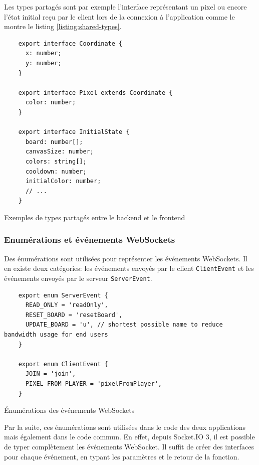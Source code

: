 Les types partagés sont par exemple l'interface représentant un pixel ou encore l'état initial reçu par le client lors de la connexion à l'application comme le montre le listing \ref{listing:shared-types}.

\begin{listing}[H]
  \begin{verbatim}
    export interface Coordinate {
      x: number;
      y: number;
    }

    export interface Pixel extends Coordinate {
      color: number;
    }

    export interface InitialState {
      board: number[];
      canvasSize: number;
      colors: string[];
      cooldown: number;
      initialColor: number;
      // ...
    }
\end{verbatim}
  \caption{Exemples de types partagés entre le backend et le frontend}
  \label{listing:shared-types}
\end{listing}

\subsubsection{Enumérations et événements WebSockets}

Des énumérations sont utilisées pour représenter les événements WebSockets. Il en existe deux catégories: les événements envoyés par le client \texttt{ClientEvent} et les événements envoyés par le serveur \texttt{ServerEvent}.

\begin{listing}[H]
  \begin{verbatim}
    export enum ServerEvent {
      READ_ONLY = 'readOnly',
      RESET_BOARD = 'resetBoard',
      UPDATE_BOARD = 'u', // shortest possible name to reduce bandwidth usage for end users
    }

    export enum ClientEvent {
      JOIN = 'join',
      PIXEL_FROM_PLAYER = 'pixelFromPlayer',
    }
\end{verbatim}
  \caption{Énumérations des événements WebSockets}
  \label{listing:websocket-events-enums}
\end{listing}

Par la suite, ces énumérations sont utilisées dans le code des deux applications mais également dans le code commun. En effet, depuis Socket.IO 3, il est possible de typer complètement les événements WebSocket. Il suffit de créer des interfaces pour chaque événement, en typant les paramètres et le retour de la fonction.

